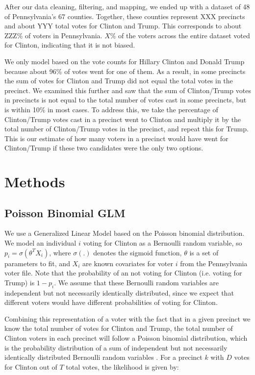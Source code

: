 \documentclass[10pt, letterpaper]{article}
\begin{document}
After our data cleaning, filtering, and mapping, we ended up with a dataset of 48 of Pennsylvania's 67 counties. Together, these counties represent XXX precincts and about YYY total votes for Clinton and Trump. This corresponds to about ZZZ\% of voters in Pennsylvania. $X\%$ of the voters across the entire dataset voted for Clinton, indicating that it is not  biased.

We only model based on the vote counts for Hillary Clinton and Donald Trump because about 96\% of votes went for one of them. As a result, in some precincts the sum of votes for Clinton and Trump did not equal the total votes in the precinct. We examined this further and saw that the sum of Clinton/Trump votes in precincts is not equal to the total number of votes cast in some precincts, but is within 10\% in most cases. To address this, we take the percentage of Clinton/Trump votes cast in a precinct went to Clinton and multiply it by the total number of Clinton/Trump votes in the precinct, and repeat this for Trump. This is our estimate of how many voters in a precinct would have went for Clinton/Trump if these two candidates were the only two options.

\section{Methods}

\subsection{Poisson Binomial GLM}

We use a Generalized Linear Model based on the Poisson binomial distribution. We model an individual $i$ voting for Clinton as a Bernoulli random variable, so $p_i = \sigma(\theta^TX_i)$, where $\sigma(.)$ denotes the sigmoid function, $\theta$ is a set of parameters to fit, and $X_i$ are known covariates for voter $i$ from the Pennsylvania voter file. Note that the probability of an not voting for Clinton (i.e. voting for Trump) is $1 - p_i$. We assume that these Bernoulli random variables are independent but not necessarily identically distributed, since we expect that different voters would have different probabilities of voting for Clinton.

Combining this representation of a voter with the fact that in a given precinct we know the total number of votes for Clinton and Trump, the total number of Clinton voters in each precinct will follow a Poisson binomial distribution, which is the probability distribution of a sum of independent but not necessarily identically distributed Bernoulli random variables \cite{Poibi}. For a precinct $k$ with $D$ votes for Clinton out of $T$ total votes, the likelihood is given by:
\end{document}
